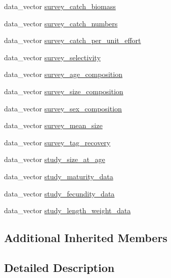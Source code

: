 \begin{DoxyCompactItemize}
data\+\_\+vector \hyperlink{classmas_1_1_observation_a4b522ae120f56ca4e0f059c5bd74feec}{survey\+\_\+catch\+\_\+biomass}
\item 
data\+\_\+vector \hyperlink{classmas_1_1_observation_ab872d39efd69ea612fefb5b3eb22bd8a}{survey\+\_\+catch\+\_\+numbers}
\item 
data\+\_\+vector \hyperlink{classmas_1_1_observation_ad5abe789449f80832b9c22a6eac937bc}{survey\+\_\+catch\+\_\+per\+\_\+unit\+\_\+effort}
\item 
data\+\_\+vector \hyperlink{classmas_1_1_observation_a84b4905765c885a64cad087c157d8c21}{survey\+\_\+selectivity}
\item 
data\+\_\+vector \hyperlink{classmas_1_1_observation_a03cceae9a50242b651530b0105ba5cc1}{survey\+\_\+age\+\_\+composition}
\item 
data\+\_\+vector \hyperlink{classmas_1_1_observation_a560882c02800a3157afa3d62ca3bbf98}{survey\+\_\+size\+\_\+composition}
\item 
data\+\_\+vector \hyperlink{classmas_1_1_observation_a162ad2d12da0f248d1d5f4f360c907e2}{survey\+\_\+sex\+\_\+composition}
\item 
data\+\_\+vector \hyperlink{classmas_1_1_observation_a3b7e3e8811a2ecec799c4d55b8ab48be}{survey\+\_\+mean\+\_\+size}
\item 
data\+\_\+vector \hyperlink{classmas_1_1_observation_aac55e9d5be6d73e97476f89751cfa8f9}{survey\+\_\+tag\+\_\+recovery}
\item 
data\+\_\+vector \hyperlink{classmas_1_1_observation_a10398b9be5c04879db2bec61fcdd2cee}{study\+\_\+size\+\_\+at\+\_\+age}
\item 
data\+\_\+vector \hyperlink{classmas_1_1_observation_a813400be1f65ae364a6cda022f6dffd7}{study\+\_\+maturity\+\_\+data}
\item 
data\+\_\+vector \hyperlink{classmas_1_1_observation_ae509ef85e4f1fc553388b52784ef712a}{study\+\_\+fecundity\+\_\+data}
\item 
data\+\_\+vector \hyperlink{classmas_1_1_observation_a3ab6b2699276ca697d77679a24ae3b79}{study\+\_\+length\+\_\+weight\+\_\+data}
\end{DoxyCompactItemize}
\subsection*{Additional Inherited Members}


\subsection{Detailed Description}
